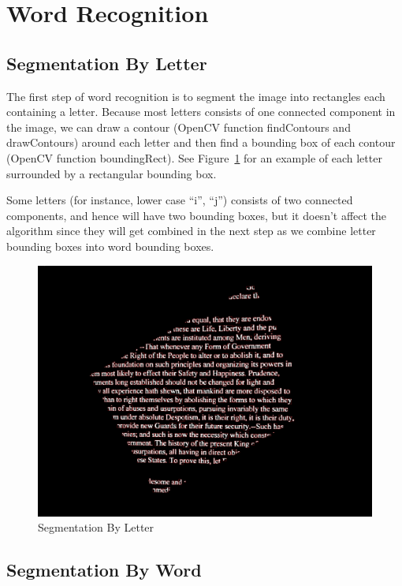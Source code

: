 \documentclass[conference]{IEEEtran}
\begin{document}
\section{Word Recognition}

\subsection{Segmentation By Letter}
The first step of word recognition is to segment the image into rectangles each containing a letter.  Because most letters consists of one connected component in the image, we can draw a contour (OpenCV function findContours and drawContours) around each letter and then find a bounding box of each contour (OpenCV function boundingRect). See Figure~\ref{letterbbox} for an example of each letter surrounded by a rectangular bounding box.

Some letters (for instance, lower case ``i'', ``j'') consists of two connected components, and hence will have two bounding boxes, but it doesn't affect the algorithm since they will get combined in the next step as we combine letter bounding boxes into word bounding boxes.

\begin{figure}
\center
\includegraphics[scale=0.10]{letter_with_bounding_box.jpg}
\caption{Segmentation By Letter}
\label{letterbbox}
\end{figure}

\subsection{Segmentation By Word}
\end{document}
